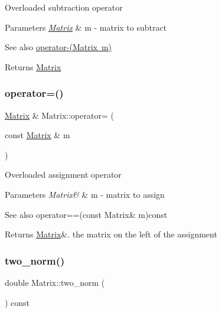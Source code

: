 Overloaded subtraction operator 
\begin{DoxyParams}{Parameters}
{\em \mbox{\hyperlink{class_matrix}{Matrix}}} & m -\/ matrix to subtract \\
\hline
\end{DoxyParams}
\begin{DoxySeeAlso}{See also}
\mbox{\hyperlink{class_matrix_a2aabf841a4302d528f8b102c0800a263}{operator-\/(\+Matrix m)}} 
\end{DoxySeeAlso}
\begin{DoxyReturn}{Returns}
\mbox{\hyperlink{class_matrix}{Matrix}} 
\end{DoxyReturn}
\mbox{\label{class_matrix_aea5a06385f646eb4a63929fae6fa3e14}} 
\subsubsection{\texorpdfstring{operator=()}{operator=()}}
{\footnotesize\ttfamily \mbox{\hyperlink{class_matrix}{Matrix}} \& Matrix\+::operator= (\begin{DoxyParamCaption}\item[{const \mbox{\hyperlink{class_matrix}{Matrix}} \&}]{m }\end{DoxyParamCaption})}

Overloaded assignment operator 
\begin{DoxyParams}{Parameters}
{\em Matrix\&} & m -\/ matrix to assign \\
\hline
\end{DoxyParams}
\begin{DoxySeeAlso}{See also}
operator==(const Matrix\& m)const 
\end{DoxySeeAlso}
\begin{DoxyReturn}{Returns}
\mbox{\hyperlink{class_matrix}{Matrix}}\&. the matrix on the left of the assignment 
\end{DoxyReturn}
\mbox{\label{class_matrix_aac496af05ec7aa26afc2b9c6d0ab8b66}} 
\subsubsection{\texorpdfstring{two\+\_\+norm()}{two\_norm()}}
{\footnotesize\ttfamily double Matrix\+::two\+\_\+norm (\begin{DoxyParamCaption}{ }\end{DoxyParamCaption}) const}


